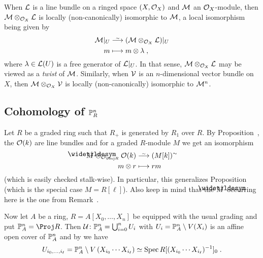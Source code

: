\documentclass[a4paper,parskip=half,numbers=enddot, DIV=12]{scrreprt}
\begin{document}
\begin{rem}
	When $\mathcal{L}$ is a line bundle on a ringed space $(X,\mathcal{O}_X)$ and $\mathcal{M}$ an $\mathcal{O}_X$-module, then $\mathcal{M}\otimes_{\mathcal{O}_X}\mathcal{L}$ is locally (non-canonically) isomorphic to $\mathcal{M}$, a local isomorphism being given by 
	\begin{align*}
		\Mm|_U&\isomorphism (\Mm\otimes_{\Oo_X}\Ll)|_U\\
		m&\longmapsto m\otimes \lambda\;,
	\end{align*}
	where $\lambda\in\mathcal{L}(U)$ is a free generator of $\mathcal{L}|_U$. In that sense, $\mathcal{M}\otimes_{\mathcal{O}_X}\mathcal{L}$ may be viewed as a \emph{twist} of $\mathcal{M}$. Similarly, when $\mathcal{V}$ is an $n$-dimensional vector bundle on $X$, then $\mathcal{M}\otimes_{\mathcal{O}_X}\mathcal{V}$ is locally (non-canonically) isomorphic to  $\mathcal{M}^n$.
	
	\subsection{Cohomology of \texorpdfstring{$\mathbb{P}_R^n$}{P}}	
	Let $R$ be a graded ring such that $R_+$ is generated by $R_1$ over $R$. By Proposition~, the $\mathcal{O}(k)$ are line bundles and for a graded $R$-module $M$ we get an isomorphism
	\begin{align*}
		\snake{M}\otimes_{\Oo_{\Proj R}}\Oo(k)&\isomorphism (M[k])^\sim\\
		m\otimes r&\longmapsto rm
	\end{align*}
	(which is easily checked stalk-wise). In particular, this generalizes Proposition~ (which is the special case $M=R[\ell]$). Also keep in mind that the $\snake{M}$ occurring here is the one from Remark~.
\end{rem}
Now let $A$ be a ring, $R=A[X_0,\ldots,X_n]$ be equipped with the usual grading and put $\IP_A^n=\Proj R$. Then $\mathcal{U}\colon \mathbb{P}_A^n=\bigcup_{i=0}^nU_i$ with $U_i=\mathbb{P}_A^n\setminus V(X_i)$ is an affine open cover of $\mathbb{P}_A^n$ and by  we have
\begin{align*}
	U_{i_0,\ldots,i_\ell}=\mathbb{P}_A^n\setminus V\left(X_{i_0}\cdots X_{i_\ell}\right)\simeq \operatorname{Spec} R[(X_{i_0}\cdots X_{i_\ell})^{-1}]_0\;.
\end{align*}
\end{document}
